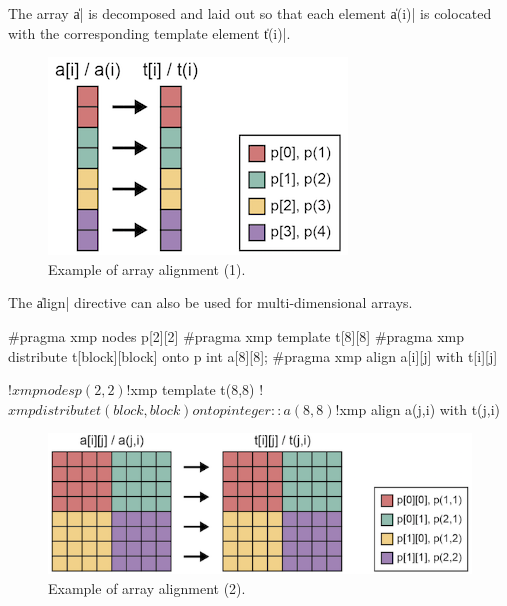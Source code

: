 The array \|a| is decomposed and laid out so that each element
\|a(i)| is colocated with the corresponding template element \|t(i)|.


\begin{figure}
  \centering
  \includegraphics{figs/1dim.png}
  \caption{Example of array alignment (1).}
\end{figure}

The \|align| directive can also be used for multi-dimensional arrays.

\begin{XCexample}
#pragma xmp nodes p[2][2]
#pragma xmp template t[8][8]
#pragma xmp distribute t[block][block] onto p
int a[8][8];
#pragma xmp align a[i][j] with t[i][j]
\end{XCexample}

\begin{XFexample}
!$xmp nodes p(2,2)
!$xmp template t(8,8)
!$xmp distribute t(block,block) onto p
integer :: a(8,8)
!$xmp align a(j,i) with t(j,i)
\end{XFexample}

\begin{figure}
  \centering
  \includegraphics{figs/multi-dim.png}
  \caption{Example of array alignment (2).}
\end{figure}


